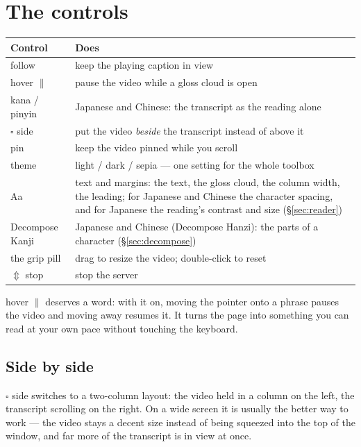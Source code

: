 \documentclass[11pt,oneside]{report}
\newcommand{\menu}[1]{\textsf{#1}}
\begin{document}
\section{The controls}
\label{sec:controls}

\begin{center}
\begin{tabular}{@{}l>{\raggedright\arraybackslash}p{}@{}}
\toprule
\textsf{Control} & \textsf{Does} \\
\midrule
\menu{follow}    & keep the playing caption in view \\
\menu{hover \(\parallel\)} & pause the video while a gloss cloud is open \\
\menu{kana} / \menu{pinyin} & Japanese and Chinese: the transcript as the reading alone \\
\menu{\(\square\) side} & put the video \emph{beside} the transcript
  instead of above it \\
\menu{pin}       & keep the video pinned while you scroll \\
\menu{theme}     & light / dark / sepia --- one setting for the whole toolbox \\
\menu{Aa}        & text and margins: the text, the gloss cloud, the column
  width, the leading; for Japanese and Chinese the character spacing, and for
  Japanese the reading's contrast and size (\S\ref{sec:reader}) \\
\menu{Decompose Kanji} & Japanese and Chinese (\menu{Decompose Hanzi}): the
  parts of a character (\S\ref{sec:decompose}) \\
the grip pill    & drag to resize the video; double-click to reset \\
\(\Updownarrow\) stop & stop the server \\
\bottomrule
\end{tabular}
\end{center}

\menu{hover \(\parallel\)} deserves a word: with it on, moving the pointer
onto a phrase pauses the video and moving away resumes it. It turns the page
into something you can read at your own pace without touching the keyboard.

\subsection*{Side by side}

\menu{\(\square\) side} switches to a two-column layout: the video held in
a column on the left, the transcript scrolling on the right. On a wide
screen it is usually the better way to work --- the video stays a decent
size instead of being squeezed into the top of the window, and far more of
the transcript is in view at once.
\end{document}

